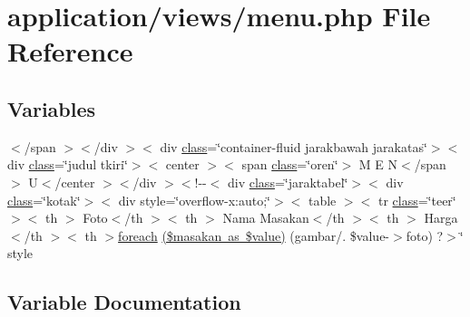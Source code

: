 \hypertarget{menu_8php}{}\section{application/views/menu.php File Reference}
\label{menu_8php}
\subsection*{Variables}
\begin{DoxyCompactItemize}
\item 
$<$/span $>$$<$/div $>$$<$ div \mbox{\hyperlink{waiter_2olaporan_8php_a185c73c6507391d1eb38c776b68ce96d}{class}}=\char`\"{}container-\/fluid jarakbawah jarakatas\char`\"{}$>$$<$ div \mbox{\hyperlink{waiter_2olaporan_8php_a185c73c6507391d1eb38c776b68ce96d}{class}}=\char`\"{}judul tkiri\char`\"{}$>$$<$ center $>$$<$ span \mbox{\hyperlink{waiter_2olaporan_8php_a185c73c6507391d1eb38c776b68ce96d}{class}}=\char`\"{}oren\char`\"{}$>$ M E N$<$/span $>$ U$<$/center $>$$<$/div $>$$<$!-\/-\/$<$ div \mbox{\hyperlink{waiter_2olaporan_8php_a185c73c6507391d1eb38c776b68ce96d}{class}}=\char`\"{}jaraktabel\char`\"{}$>$$<$ div \mbox{\hyperlink{waiter_2olaporan_8php_a185c73c6507391d1eb38c776b68ce96d}{class}}=\char`\"{}kotak\char`\"{}$>$$<$ div style=\char`\"{}overflow-\/x\+:auto;\char`\"{}$>$$<$ table $>$$<$ tr \mbox{\hyperlink{waiter_2olaporan_8php_a185c73c6507391d1eb38c776b68ce96d}{class}}=\char`\"{}teer\char`\"{}$>$$<$ th $>$ Foto$<$/th $>$$<$ th $>$ Nama Masakan$<$/th $>$$<$ th $>$ Harga$<$/th $>$$<$ th $>$\mbox{\hyperlink{pdetailorder_8php_a2e23c42e9b59be6e2bbc1bac76422d34}{foreach}} \mbox{\hyperlink{menu_8php_a002ea2af4e8b4795828ce10d7afc6db7}{(\$masakan as \$value)}} (\textquotesingle{}gambar/\textquotesingle{}. \$value-\/$>$foto) ?$>$\char`\"{} style
\end{DoxyCompactItemize}


\subsection{Variable Documentation}
\mbox{\label{menu_8php_a002ea2af4e8b4795828ce10d7afc6db7}} 
